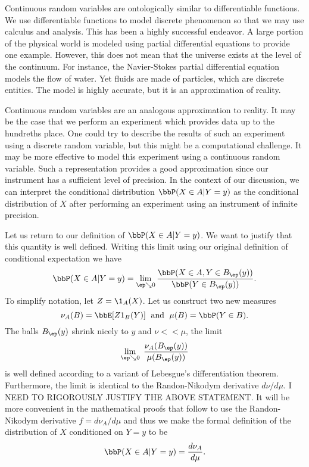 \documentclass{report}
\begin{document}
Continuous random variables are ontologically similar to differentiable functions.  We use differentiable functions to model discrete phenomenon so that we may use calculus and analysis.  This has been a highly successful endeavor.  A large portion of the physical world is modeled using partial differential equations to provide one example.  However, this does not mean that the universe exists at the level of the continuum.  For instance, the Navier-Stokes partial differential equation models the flow of water.  Yet fluids are made of particles, which are discrete entities.  The model is highly accurate, but it is an approximation of reality.

Continuous random variables are an analogous approximation to reality.  It may be the case that we perform an experiment which provides data up to the hundreths place.  One could try to describe the results of such an experiment using a discrete random variable, but this might be a computational challenge.  It may be more effective to model this experiment using a continuous random variable.  Such a representation provides a good approximation since our instrument has a sufficient level of precision.  In the context of our discussion, we can interpret the conditional distribution $\bbP(X \in A | Y = y)$ as the conditional distribution of $X$ after performing an experiment using an instrument of infinite precision.

Let us return to our definition of $\bbP(X \in A | Y = y)$.  We want to justify that this quantity is well defined.  Writing this limit using our original definition of conditional expectation we have
\[
\bbP(X \in A | Y = y) = \lim_{\ep \searrow 0} \frac{\bbP(X \in A, Y \in B_\ep(y))}{\bbP(Y \in B_\ep(y))}.
\]
To simplify notation, let $Z = \1_A(X)$.  Let us construct two new measures
\[
\nu_A(B) = \bbE[Z 1_B(Y)] \; \textmd{ and } \; \mu(B) = \bbP(Y \in B).
\]
The balls $B_\ep(y)$ shrink nicely to $y$ and $\nu << \mu$, the limit
\[
\lim_{\ep \searrow 0} \; \frac{\nu_A(B_\ep(y))}{\mu(B_\ep(y))}
\]
is well defined according to a variant of Lebesgue's differentiation theorem.  Furthermore, the limit is identical to the Randon-Nikodym derivative $d\nu / d\mu$.  I NEED TO RIGOROUSLY JUSTIFY THE ABOVE STATEMENT.  It will be more convenient in the mathematical proofs that follow to use the Randon-Nikodym derivative $f = d \nu_A / d \mu$ and thus we make the formal definition of the distribution of $X$ conditioned on $Y = y$ to be
\[
\bbP(X \in A | Y = y) = \frac{ d \nu_A }{d \mu}.
\]
\end{document}
